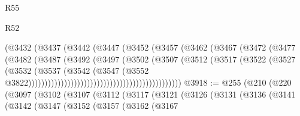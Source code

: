 \begin{lexlean}{R55}
\begin{lexlean}{R52}
\begin{coremodule}
{{{{{{{{{{{{{{{{{{{{{{{{{{{{{{{{{{{{{{{{{{{{{{{{{{{{{{{{{{{{{{{{{{{{{{{{{{{{{{{{{{{{{{{{{{{{{{{{{{{{{{{{{{{{{{{{{{{{{{{{{{{{{{{{{{{{{{{{{{{{{{{{{{{{{{{{{{{{{{{{{{{{{{{{{{{{{{{{{{{{{{{{{{{{{{{{{{{{{{                                                (@3432
                                                  (@3437
                                                    (@3442
                                                      (@3447
                                                        (@3452
                                                          (@3457
                                                            (@3462
                                                              (@3467
                                                                (@3472
                                                                  (@3477
                                                                    (@3482
                                                                      (@3487
                                                                        (@3492
                                                                          (@3497
                                                                            (@3502
                                                                              (@3507
                                                                                (@3512
                                                                                  (@3517
                                                                                    (@3522
                                                                                      (@3527
                                                                                        (@3532
                                                                                          (@3537
                                                                                            (@3542
                                                                                              (@3547
                                                                                                (@3552
                                                                                                  @3822)))))))))))))))))))))))))))))))))))))))))))))))
@3918 := @255
    (@210
      (@220
        (@3097
          (@3102
            (@3107
              (@3112
                (@3117
                  (@3121
                    (@3126
                      (@3131
                        (@3136
                          (@3141
                            (@3142
                              (@3147
                                (@3152
                                  (@3157
                                    (@3162
                                      (@3167
}}}}}}}}}}}}}}}}}}}}}}}}}}}}}}}}}}}}}}}}}}}}}}}}}}}}}}}}}}}}}}}}}}}}}}}}}}}}}}}}}}}}}}}}}}}}}}}}}}}}}}}}}}}}}}}}}}}}}}}}}}}}}}}}}}}}}}}}}}}}}}}}}}}}}}}}}}}}}}}}}}}}}}}}}}}}}}}}}}}}}}}}}}}}}}}}}}}}}}
\end{coremodule}
\end{lexlean}
\end{lexlean}
